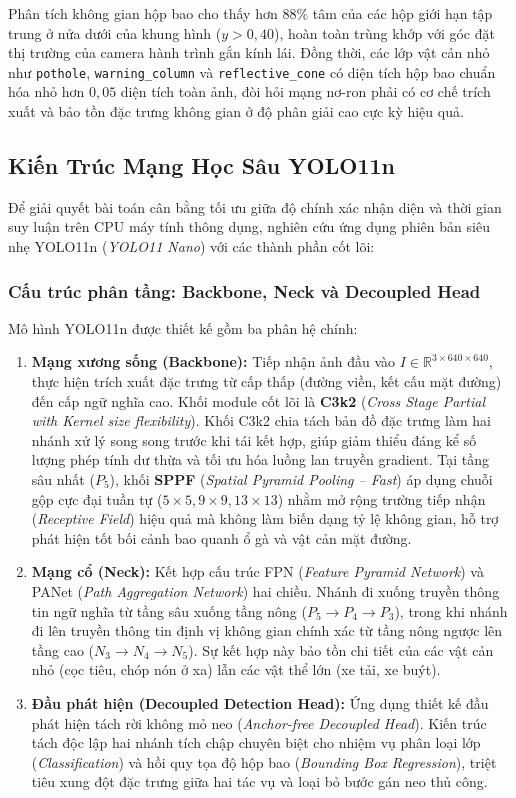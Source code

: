 \documentclass[12pt,a4paper]{article}
\begin{document}
Phân tích không gian hộp bao cho thấy hơn $88\%$ tâm của các hộp giới hạn tập trung ở nửa dưới của khung hình ($y > 0,40$), hoàn toàn trùng khớp với góc đặt thị trường của camera hành trình gắn kính lái. Đồng thời, các lớp vật cản nhỏ như \texttt{pothole}, \texttt{warning\_column} và \texttt{reflective\_cone} có diện tích hộp bao chuẩn hóa nhỏ hơn $0,05$ diện tích toàn ảnh, đòi hỏi mạng nơ-ron phải có cơ chế trích xuất và bảo tồn đặc trưng không gian ở độ phân giải cao cực kỳ hiệu quả.

\subsection{Kiến Trúc Mạng Học Sâu YOLO11n}
\label{subsec:kien_truc_yolo11n}
Để giải quyết bài toán cân bằng tối ưu giữa độ chính xác nhận diện và thời gian suy luận trên CPU máy tính thông dụng, nghiên cứu ứng dụng phiên bản siêu nhẹ YOLO11n (\textit{YOLO11 Nano}) với các thành phần cốt lõi:

\subsubsection{Cấu trúc phân tầng: Backbone, Neck và Decoupled Head}
Mô hình YOLO11n được thiết kế gồm ba phân hệ chính:
\begin{enumerate}
    \item \textbf{Mạng xương sống (Backbone):} Tiếp nhận ảnh đầu vào $I \in \mathbb{R}^{3 \times 640 \times 640}$, thực hiện trích xuất đặc trưng từ cấp thấp (đường viền, kết cấu mặt đường) đến cấp ngữ nghĩa cao. Khối module cốt lõi là \textbf{C3k2} (\textit{Cross Stage Partial with Kernel size flexibility}). Khối C3k2 chia tách bản đồ đặc trưng làm hai nhánh xử lý song song trước khi tái kết hợp, giúp giảm thiểu đáng kể số lượng phép tính dư thừa và tối ưu hóa luồng lan truyền gradient. Tại tầng sâu nhất ($P_5$), khối \textbf{SPPF} (\textit{Spatial Pyramid Pooling -- Fast}) áp dụng chuỗi gộp cực đại tuần tự ($5 \times 5, 9 \times 9, 13 \times 13$) nhằm mở rộng trường tiếp nhận (\textit{Receptive Field}) hiệu quả mà không làm biến dạng tỷ lệ không gian, hỗ trợ phát hiện tốt bối cảnh bao quanh ổ gà và vật cản mặt đường.
    \item \textbf{Mạng cổ (Neck):} Kết hợp cấu trúc FPN (\textit{Feature Pyramid Network}) và PANet (\textit{Path Aggregation Network}) hai chiều. Nhánh đi xuống truyền thông tin ngữ nghĩa từ tầng sâu xuống tầng nông ($P_5 \to P_4 \to P_3$), trong khi nhánh đi lên truyền thông tin định vị không gian chính xác từ tầng nông ngược lên tầng cao ($N_3 \to N_4 \to N_5$). Sự kết hợp này bảo tồn chi tiết của các vật cản nhỏ (cọc tiêu, chóp nón ở xa) lẫn các vật thể lớn (xe tải, xe buýt).
    \item \textbf{Đầu phát hiện (Decoupled Detection Head):} Ứng dụng thiết kế đầu phát hiện tách rời không mỏ neo (\textit{Anchor-free Decoupled Head}). Kiến trúc tách độc lập hai nhánh tích chập chuyên biệt cho nhiệm vụ phân loại lớp (\textit{Classification}) và hồi quy tọa độ hộp bao (\textit{Bounding Box Regression}), triệt tiêu xung đột đặc trưng giữa hai tác vụ và loại bỏ bước gán neo thủ công.
\end{enumerate}
\end{document}
